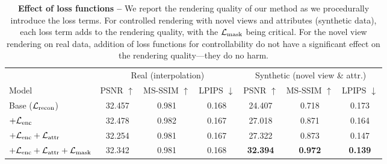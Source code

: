 \begin{table}
  \centering
  \normalsize
  \setlength{\tabcolsep}{2pt}
  \begin{tabular}{@{}lccc ccc@{}}
    \toprule
          & \multicolumn{3}{c}{Real (interpolation)} & \multicolumn{3}{c}{Synthetic (novel view \& attr.)}                                                                                  \\
    \cmidrule(lr){2-4}
    \cmidrule(lr){5-7}
    Model & PSNR $\uparrow$ & MS-SSIM $\uparrow$ & LPIPS $\downarrow$ & PSNR
    $\uparrow$ & MS-SSIM $\uparrow$ & LPIPS $\downarrow$ \\ \midrule Base
    ($\mathcal{L}_\text{recon}$) & 32.457 & 0.981 & 0.168 & 24.407 & 0.718 & 0.173 \\
    $+\mathcal{L}_\text{enc}$ & 32.478 & 0.982 & 0.167 & 27.018 & 0.871 & 0.164 \\ $+
    \mathcal{L}_\text{enc} +\mathcal{L}_\text{attr}$ & 32.254 & 0.981 & 0.167 & 27.322 & 0.873 & 0.147
    \\ $+ \mathcal{L}_\text{enc} + \mathcal{L}_\text{attr} +\mathcal{L}_\text{mask}$ & 32.342 & 0.981 & 0.168 &
    \textbf{32.394} & \textbf{0.972} & \textbf{0.139}\\
    \bottomrule\end{tabular} \caption{ \textbf{{Effect of loss functions --}}
    We report the rendering quality of our method as we procedurally introduce
    the loss terms.
    For controlled rendering with novel views and attributes (synthetic data),
    each loss term adds to the rendering quality, with the $\mathcal{L}_\text{mask}$ being
    critical.
    For the novel view rendering on real data, addition of loss functions for
    controllability do not have a significant effect on the rendering
    quality---they do no harm.
  } %
  \label{tab:conerf-ablations}
\end{table}